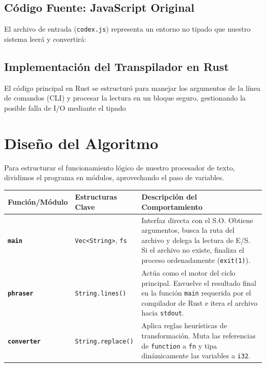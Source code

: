 \documentclass[11pt, letterpaper]{article}
\begin{document}
	\subsection{Código Fuente: JavaScript Original}
	El archivo de entrada (\texttt{codex.js}) representa un entorno no tipado que nuestro sistema leerá y convertirá:
	

	
	\subsection{Implementación del Transpilador en Rust}
	El código principal en Rust se estructuró para manejar los argumentos de la línea de comandos (CLI) y procesar la lectura en un bloque seguro, gestionando la posible falla de I/O mediante el tipado 
	

			
			\section{Diseño del Algoritmo}
			
			Para estructurar el funcionamiento lógico de nuestro procesador de texto, dividimos el programa en módulos, aprovechando el paso de variables.
			
			\vspace{0.5cm}
			\noindent
			\begin{tabular}{p{2.5cm} p{4.5cm} p{7cm}}
				\toprule
				\textbf{Función/Módulo} & \textbf{Estructuras Clave} & \textbf{Descripción del Comportamiento} \\
				\midrule
				\textbf{\texttt{main}} & \texttt{Vec<String>}, \texttt{fs} & Interfaz directa con el S.O. Obtiene argumentos, busca la ruta del archivo y delega la lectura de E/S. Si el archivo no existe, finaliza el proceso ordenadamente (\texttt{exit(1)}). \\
				\textbf{\texttt{phraser}} & \texttt{String.lines()} & Actúa como el motor del ciclo principal. Envuelve el resultado final en la función \texttt{main} requerida por el compilador de Rust e itera el archivo hacia \texttt{stdout}. \\
				\textbf{\texttt{converter}} & \texttt{String.replace()} & Aplica reglas heurísticas de transformación. Muta las referencias de \texttt{function} a \texttt{fn} y tipa dinámicamente las variables a \texttt{i32}. \\
				\bottomrule
			\end{tabular}
			\vspace{0.5cm}
\end{document}
